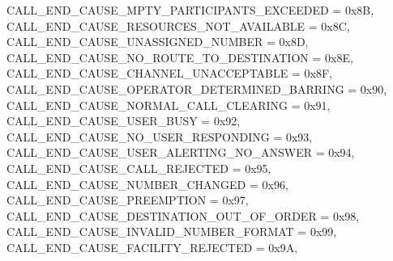 \begin{DoxyItemize}
 C\+A\+L\+L\+\_\+\+E\+N\+D\+\_\+\+C\+A\+U\+S\+E\+\_\+\+M\+P\+T\+Y\+\_\+\+P\+A\+R\+T\+I\+C\+I\+P\+A\+N\+T\+S\+\_\+\+E\+X\+C\+E\+E\+D\+ED = 0x8B,~\newline
 C\+A\+L\+L\+\_\+\+E\+N\+D\+\_\+\+C\+A\+U\+S\+E\+\_\+\+R\+E\+S\+O\+U\+R\+C\+E\+S\+\_\+\+N\+O\+T\+\_\+\+A\+V\+A\+I\+L\+A\+B\+LE = 0x8C,~\newline
 C\+A\+L\+L\+\_\+\+E\+N\+D\+\_\+\+C\+A\+U\+S\+E\+\_\+\+U\+N\+A\+S\+S\+I\+G\+N\+E\+D\+\_\+\+N\+U\+M\+B\+ER = 0x8D,~\newline
 C\+A\+L\+L\+\_\+\+E\+N\+D\+\_\+\+C\+A\+U\+S\+E\+\_\+\+N\+O\+\_\+\+R\+O\+U\+T\+E\+\_\+\+T\+O\+\_\+\+D\+E\+S\+T\+I\+N\+A\+T\+I\+ON = 0x8E,~\newline
 C\+A\+L\+L\+\_\+\+E\+N\+D\+\_\+\+C\+A\+U\+S\+E\+\_\+\+C\+H\+A\+N\+N\+E\+L\+\_\+\+U\+N\+A\+C\+C\+E\+P\+T\+A\+B\+LE = 0x8F,~\newline
 C\+A\+L\+L\+\_\+\+E\+N\+D\+\_\+\+C\+A\+U\+S\+E\+\_\+\+O\+P\+E\+R\+A\+T\+O\+R\+\_\+\+D\+E\+T\+E\+R\+M\+I\+N\+E\+D\+\_\+\+B\+A\+R\+R\+I\+NG = 0x90,~\newline
 C\+A\+L\+L\+\_\+\+E\+N\+D\+\_\+\+C\+A\+U\+S\+E\+\_\+\+N\+O\+R\+M\+A\+L\+\_\+\+C\+A\+L\+L\+\_\+\+C\+L\+E\+A\+R\+I\+NG = 0x91,~\newline
 C\+A\+L\+L\+\_\+\+E\+N\+D\+\_\+\+C\+A\+U\+S\+E\+\_\+\+U\+S\+E\+R\+\_\+\+B\+U\+SY = 0x92,~\newline
 C\+A\+L\+L\+\_\+\+E\+N\+D\+\_\+\+C\+A\+U\+S\+E\+\_\+\+N\+O\+\_\+\+U\+S\+E\+R\+\_\+\+R\+E\+S\+P\+O\+N\+D\+I\+NG = 0x93,~\newline
 C\+A\+L\+L\+\_\+\+E\+N\+D\+\_\+\+C\+A\+U\+S\+E\+\_\+\+U\+S\+E\+R\+\_\+\+A\+L\+E\+R\+T\+I\+N\+G\+\_\+\+N\+O\+\_\+\+A\+N\+S\+W\+ER = 0x94,~\newline
 C\+A\+L\+L\+\_\+\+E\+N\+D\+\_\+\+C\+A\+U\+S\+E\+\_\+\+C\+A\+L\+L\+\_\+\+R\+E\+J\+E\+C\+T\+ED = 0x95,~\newline
 C\+A\+L\+L\+\_\+\+E\+N\+D\+\_\+\+C\+A\+U\+S\+E\+\_\+\+N\+U\+M\+B\+E\+R\+\_\+\+C\+H\+A\+N\+G\+ED = 0x96,~\newline
 C\+A\+L\+L\+\_\+\+E\+N\+D\+\_\+\+C\+A\+U\+S\+E\+\_\+\+P\+R\+E\+E\+M\+P\+T\+I\+ON = 0x97,~\newline
 C\+A\+L\+L\+\_\+\+E\+N\+D\+\_\+\+C\+A\+U\+S\+E\+\_\+\+D\+E\+S\+T\+I\+N\+A\+T\+I\+O\+N\+\_\+\+O\+U\+T\+\_\+\+O\+F\+\_\+\+O\+R\+D\+ER = 0x98,~\newline
 C\+A\+L\+L\+\_\+\+E\+N\+D\+\_\+\+C\+A\+U\+S\+E\+\_\+\+I\+N\+V\+A\+L\+I\+D\+\_\+\+N\+U\+M\+B\+E\+R\+\_\+\+F\+O\+R\+M\+AT = 0x99,~\newline
 C\+A\+L\+L\+\_\+\+E\+N\+D\+\_\+\+C\+A\+U\+S\+E\+\_\+\+F\+A\+C\+I\+L\+I\+T\+Y\+\_\+\+R\+E\+J\+E\+C\+T\+ED = 0x9A,~\newline

\end{DoxyItemize}
